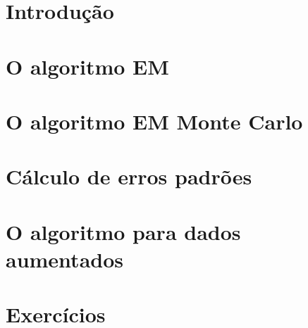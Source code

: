 \documentclass[
]{latex/krantz}
\theoremstyle{definition}
\theoremstyle{definition}
\theoremstyle{definition}
\theoremstyle{definition}
\theoremstyle{remark}
\begin{document}
\hypertarget{introduuxe7uxe3o-15}{%
\section{Introdução}\label{introduuxe7uxe3o-15}}

\hypertarget{o-algoritmo-em}{%
\section{O algoritmo EM}\label{o-algoritmo-em}}

\hypertarget{o-algoritmo-em-monte-carlo}{%
\section{O algoritmo EM Monte Carlo}\label{o-algoritmo-em-monte-carlo}}

\hypertarget{cuxe1lculo-de-erros-padruxf5es}{%
\section{Cálculo de erros padrões}\label{cuxe1lculo-de-erros-padruxf5es}}

\hypertarget{o-algoritmo-para-dados-aumentados}{%
\section{O algoritmo para dados aumentados}\label{o-algoritmo-para-dados-aumentados}}

\hypertarget{exercuxedcios-15}{%
\section{Exercícios}\label{exercuxedcios-15}}

\backmatter

  

\printindex
\end{document}
